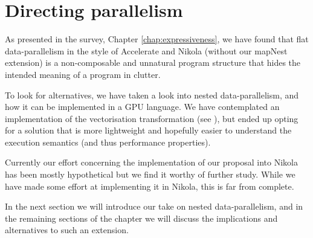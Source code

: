 \chapter{Directing parallelism}
\label{chap:directing-parallelism}



As presented in the survey, Chapter \ref{chap:expressiveness}, we have
found that flat data-parallelism in the style of Accelerate and Nikola
(without our mapNest extension) is a non-composable and unnatural program
structure that hides the intended meaning of a program in clutter.

To look for alternatives, we have taken a look into nested data-parallelism,
and how it can be implemented in a GPU language. We have contemplated an
implementation of the vectorisation transformation (see
\cite{blelloch1990vector}), but ended up opting for a solution that is more
lightweight and hopefully easier to understand the execution semantics (and
thus performance properties).

Currently our effort concerning the implementation of our proposal
into Nikola has been mostly hypothetical but we find it worthy of
further study.  While we have made some effort at implementing it in
Nikola, this is far from complete.

In the next section we will introduce our take on nested
data-parallelism, and in the remaining sections of the chapter we will
discuss the implications and alternatives to such an extension.

